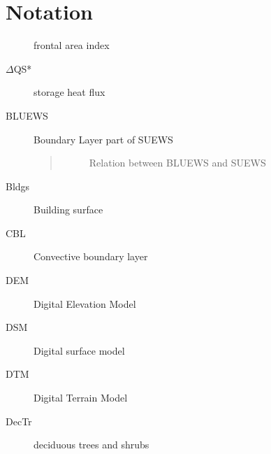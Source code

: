 \documentclass[letterpaper,10pt,english]{sphinxmanual}
\begin{document}
\chapter{Notation}
\label{\detokenize{notation::doc}}\label{\detokenize{notation:notation}}\begin{description}
\item[{}] \leavevmode{}\label{\detokenize{notation:term-f}}
frontal area  index

\item[{\(\Delta\)QS*}] \leavevmode{}\label{\detokenize{notation:term-qs}}
storage heat flux

\item[{BLUEWS}] \leavevmode{}\label{\detokenize{notation:term-bluews}}
Boundary Layer  part of SUEWS
\begin{quote}

\begin{figure}[htbp]
\centering
\capstart

\noindent{}
\caption{Relation between BLUEWS and SUEWS}\label{\detokenize{notation:id10}}\end{figure}
\end{quote}

\item[{Bldgs}] \leavevmode{}\label{\detokenize{notation:term-bldgs}}
Building  surface

\item[{CBL}] \leavevmode{}\label{\detokenize{notation:term-cbl}}
Convective  boundary layer

\item[{DEM}] \leavevmode{}\label{\detokenize{notation:term-dem}}
Digital   Elevation Model

\item[{DSM}] \leavevmode{}\label{\detokenize{notation:term-dsm}}
Digital surface  model

\item[{DTM}] \leavevmode{}\label{\detokenize{notation:term-dtm}}
Digital Terrain Model

\item[{DecTr}] \leavevmode{}\label{\detokenize{notation:term-dectr}}
deciduous trees and shrubs


\end{description}
\end{document}
